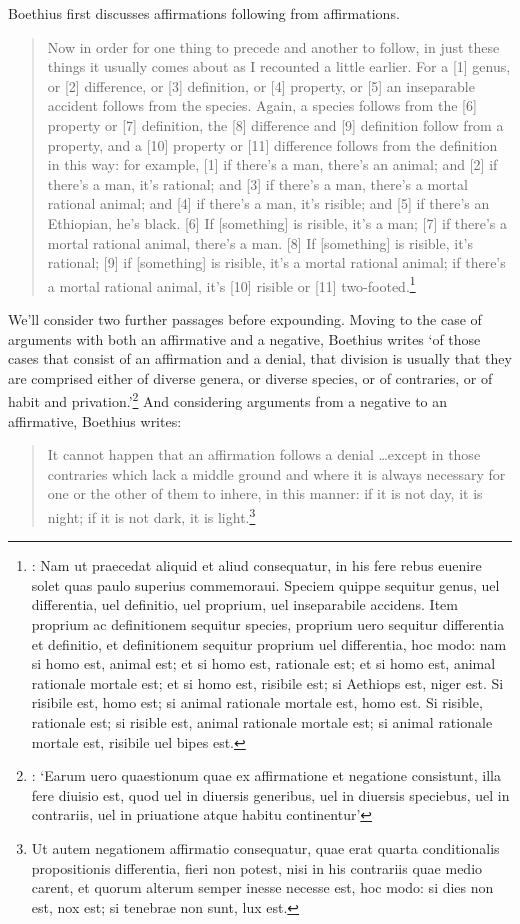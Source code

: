 \documentclass[a4paper, 11pt]{article}
\begin{document}
Boethius first discusses affirmations following from affirmations.
\begin{quote}
Now in order for one thing to precede and another to follow, in just these things it usually comes about as I recounted a little earlier. For a [1] genus, or [2] difference, or [3] definition, or [4] property, or [5] an inseparable accident follows from the species. Again, a species follows from the [6] property or [7] definition, the [8] difference and [9] definition follow from a property, and a [10] property or [11] difference follows from the definition in this way: for example, [1] if there's a man, there's an animal; and [2] if there's a man, it's rational; and [3] if there's a man, there's a mortal rational animal; and [4] if there's a man, it's risible; and [5] if there's an Ethiopian, he's black. [6] If [something] is risible, it's a man; [7] if there's a mortal rational animal, there's a man. [8] If [something] is risible, it's rational; [9] if [something] is risible, it's a mortal rational animal; if there's a mortal rational animal, it's [10] risible or [11] two-footed.\footnote{\autocite[1179A-B]{BDT}: Nam ut praecedat aliquid et aliud consequatur, in his fere rebus euenire solet quas paulo superius commemoraui. Speciem quippe sequitur genus, uel differentia, uel definitio, uel proprium, uel inseparabile accidens. Item proprium ac definitionem sequitur species, proprium uero sequitur differentia et definitio, et definitionem sequitur proprium uel differentia, hoc modo: nam si homo est, animal est; et si homo est, rationale est; et si homo est, animal rationale mortale est; et si homo est, risibile est; si Aethiops est, niger est. Si risibile est, homo est; si animal rationale mortale est, homo est. Si risible, rationale est; si risible est, animal rationale mortale est; si animal rationale mortale est, risibile uel bipes est.}
\end{quote}

We'll consider two further passages before expounding. Moving to the case of arguments with both an affirmative and a negative, Boethius writes `of those cases that consist of an affirmation and a denial, that division is usually that they are comprised either of diverse genera, or diverse species, or of contraries, or of habit and privation.'\footnote{\autocite[1179D]{BDT}: `Earum uero quaestionum quae ex affirmatione et negatione consistunt, illa fere diuisio est, quod uel in diuersis generibus, uel in diuersis speciebus, uel in contrariis, uel in priuatione atque habitu continentur'} And considering arguments from a negative to an affirmative, Boethius writes: 
\begin{quote}
It cannot happen that an affirmation follows a denial \ldots except in those contraries which lack a middle ground and where it is always necessary for one or the other of them to inhere, in this manner: if it is not day, it is night; if it is not dark, it is light.\footnote{\autocite[1180A]{BDT} Ut autem negationem affirmatio consequatur, quae erat quarta conditionalis propositionis differentia, fieri non potest, nisi in his contrariis quae medio carent, et quorum alterum semper inesse necesse est, hoc modo: si dies non est, nox est; si tenebrae non sunt, lux est.} 
\end{quote}
\end{document}
